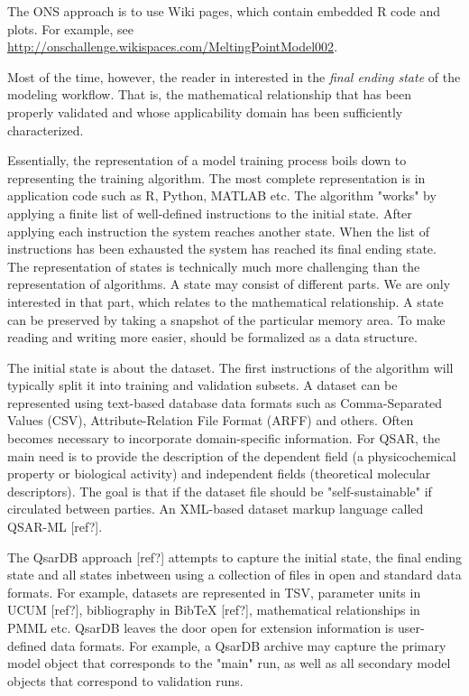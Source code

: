 \documentclass[12pt,letterpaper]{article}
\begin{document}
The ONS approach is to use Wiki pages, which contain embedded R code
and plots. For example, see
\url{http://onschallenge.wikispaces.com/MeltingPointModel002}.

Most of the time, however, the reader in interested in the \emph{final
ending state} of the modeling workflow. That is, the mathematical 
relationship that has been properly validated and whose applicability 
domain has been sufficiently characterized.

Essentially, the representation of a model training process boils down
to representing the training algorithm. The most complete representation
is in application code such as R, Python, MATLAB etc.
The algorithm "works" by applying a finite list of well-defined 
instructions to the initial state. After applying each instruction the
system reaches another state. When the list of instructions has been
exhausted the system has reached its final ending state.
The representation of states is technically much more challenging than 
the representation of algorithms. A state may consist of different
parts. We are only interested in that part, which relates to the 
mathematical relationship. A state can be preserved by taking a snapshot
of the particular memory area. To make reading and writing more easier,
should be formalized as a data structure.

The initial state is about the dataset. The first instructions of the
algorithm will typically split it into training and validation subsets.
A dataset can be represented using text-based database data formats such
as Comma-Separated Values (CSV), Attribute-Relation File Format (ARFF)
and others. Often becomes necessary to incorporate domain-specific
information. For QSAR, the main need is to provide the description of
the dependent field (a physicochemical property or biological activity)
and independent fields (theoretical molecular descriptors). The goal is
that if the dataset file should be "self-sustainable" if circulated
between parties. An XML-based dataset markup language called QSAR-ML [ref?].

The QsarDB approach [ref?] attempts to capture the initial state, the 
final ending state and all states inbetween using a collection of files
in open and standard data formats. For example, datasets are represented
in TSV, parameter units in UCUM [ref?], bibliography in BibTeX [ref?], 
mathematical relationships in PMML etc. QsarDB leaves the door open
for extension information is user-defined data formats. For example, a
QsarDB archive may capture the primary model object that corresponds to 
the "main" run, as well as all secondary model objects that correspond to 
validation runs.
\end{document}
